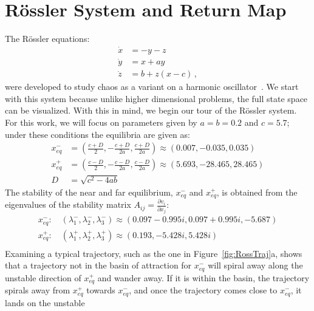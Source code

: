 \documentclass[10pt,letter]{article}
\begin{document}
\section{R\"ossler System and Return Map}
\label{sec:Ross}
The R\"ossler equations:
\begin{equation}
\begin{split}
  \dot x &= -y -z \\
  \dot y &= x + a y \\
  \dot z &= b + z (x - c) \,,
  \label{eq:Rossler}
\end{split}
\end{equation}
were developed to study chaos as a variant on a harmonic
oscillator~\cite{CB}.  We start with this system because unlike higher
dimensional problems, the full state space can be visualized.  With this
in mind, we begin our tour of the R\"ossler system.
For this work, we will focus on parameters given by $a = b = 0.2$ and $c
= 5.7$; under these conditions the equilibria are given as:
\begin{equation}
\begin{split}
x_{eq}^{-} &= (\frac{c+D}{2}, -\frac{c+D}{2a}, \frac{c+D}{2a}) \approx (0.007,-0.035,0.035)\\
x_{eq}^{+} &= (\frac{c-D}{2}, -\frac{c-D}{2a}, \frac{c-D}{2a}) \approx (5.693,-28.465,28.465) \\
D &= \sqrt{c^2-4ab}
\end{split}
\label{eq:RossEq}
\end{equation}
The stability of the near and far equilibrium, $x_{eq}^{-}$ and
$x_{eq}^{+}$, is obtained from the eigenvalues of the stability matrix
$A_{ij} = \frac{\partial{v_{i}}}{\partial{x_{j}}}$:
\begin{equation}
\begin{split}
x_{eq}^{-} : \quad (\lambda_1^-, \lambda_2^-, \lambda_3^-) \approx (0.097-0.995i, 0.097+0.995i, -5.687) \\
x_{eq}^{+} : \quad (\lambda_1^+, \lambda_2^+, \lambda_3^+) \approx (0.193, -5.428i, 5.428i) \\
\end{split}
\label{eq:RossStab}
\end{equation}
Examining a typical trajectory, such as the one in
Figure~\ref{fig:RossTraj}a, shows that a trajectory not in the basin of
attraction for $x_{eq}^{-}$ will spiral away along the unstable direction
of $x_{eq}^{+}$ and wander away.  If it is within the basin, the
trajectory spirals away from $x_{eq}^{+}$ towards $x_{eq}^{-}$, and once
the trajectory comes close to $x_{eq}^{-}$, it lands on the unstable
\end{document}
